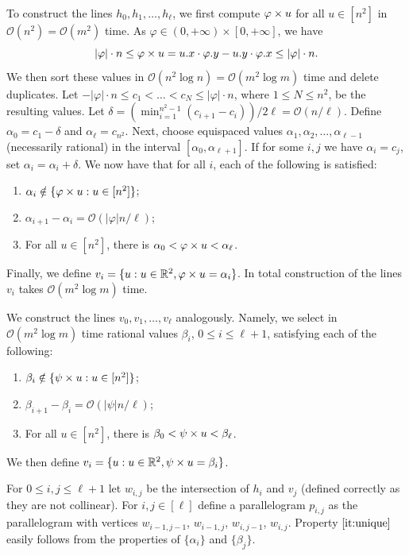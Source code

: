 \documentclass[11pt, letterpaper]{article}
\theoremstyle{plain}
\theoremstyle{definition}
\theoremstyle{remark}
\newcommand{\R}{\mathbb{R}}
\renewcommand{\O}{\mathcal{O}}
\renewcommand{\phi}{\varphi}
\newcommand{\absolute}[1]{\left\lvert#1\right\rvert}
\begin{document}
To construct the lines $h_0, h_1, \ldots, h_\ell$, we first compute $\h{u}$ for all $u \in [n^2]$ in $\O(n^2) = \O(m^2)$ time. As $\phi \in (0,+\infty) \times [0,+\infty]$, we have 
$$\absolute{\phi} \cdot n \le \h{u} = \x{u} \cdot \y{\phi} - \y{u} \cdot \x{\phi} \le \absolute{\phi} \cdot n.$$
We then sort these values in $\O(n^2 \log n) = \O(m^2 \log m)$ time and delete duplicates. Let $-\absolute{\phi} \cdot n \le c_1 < \ldots < c_{N} \le \absolute{\phi} \cdot n$, where $1 \le N \le n^2$, be the resulting values. Let $\delta = (\min_{i=1}^{n^2-1} (c_{i+1}-c_i))/2\ell = \O(n/\ell)$. Define $\alpha_0 = c_1 -\delta$ and $\alpha_\ell = c_{n^2}$. Next, choose equispaced values $\alpha_1, \alpha_2, \ldots, \alpha_{\ell-1}$ (necessarily rational) in the interval $[\alpha_0, \alpha_{\ell+1}]$. If for some $i, j$ we have $\alpha_i = c_j$, set $\alpha_i = \alpha_i + \delta$. We now have that for all $i$, each of the following is satisfied:
\begin{enumerate}
\item $\alpha_i \notin \{\h{u} : u \in [n^2]\}$;
\item $\alpha_{i+1}-\alpha_i = \O(\absolute{\phi} n / \ell)$;
\item For all $u \in [n^2]$, there is $\alpha_0 < \h{u} < \alpha_\ell$.
\end{enumerate}
Finally, we define $v_i = \{u: u \in \R^2, \h{u} = \alpha_i\}$. In total construction of the lines $v_i$ takes $\O(m^2 \log m)$ time.

We construct the lines $v_0, v_1, \ldots, v_\ell$ analogously. Namely, we select in $\O(m^2 \log m)$ time rational values $\beta_i$, $0 \le i \le \ell+1$, satisfying each of the following:
\begin{enumerate}
\item $\beta_i \notin \{\psi \times u : u \in [n^2]\}$;
\item $\beta_{i+1}-\beta_i = \O(\absolute{\psi} n / \ell)$;
\item For all $u \in [n^2]$, there is $\beta_0 < \psi \times u < \beta_\ell$.
\end{enumerate}
We then define $v_i = \{u: u \in \R^2, \s{u} = \beta_i\}$. 

For $0 \le i,j \le \ell+1$ let $w_{i,j}$ be the intersection of $h_i$ and $v_j$ (defined correctly as they are not collinear). For $i,j \in [\ell]$ define a parallelogram $p_{i,j}$ as the parallelogram with vertices $w_{i-1,j-1}$, $w_{i-1,j}$, $w_{i,j-1}$, $w_{i,j}$. Property $\ref{it:unique}$ easily follows from the properties of $\{\alpha_i\}$ and $\{\beta_j\}$.
\end{document}
